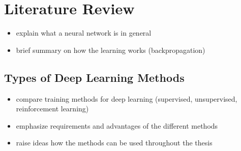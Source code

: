 \section{Literature Review}
\begin{itemize}
    \item explain what a neural network is in general
    \item brief summary on how the learning works (backpropagation)
\end{itemize}

\subsection{Types of Deep Learning Methods}
\begin{itemize}
    \item compare training methods for deep learning (supervised, unsupervised, reinforcement learning)
    \item emphasize requirements and advantages of the different methods
    \item raise ideas how the methods can be used throughout the thesis
\end{itemize}

